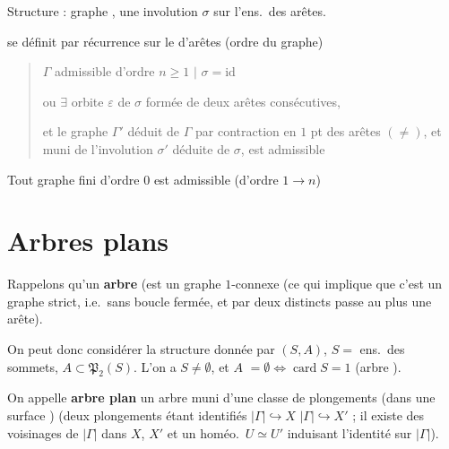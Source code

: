 \documentclass[11pt,a4paper]{article}
\begin{document}
Structure : graphe , une involution $\sigma$ \ill{} sur
l'ens.\ des arêtes.

 se définit par récurrence sur le \ill{} \ill{} d'arêtes
(ordre du graphe)

\begin{quote}
$\Gamma$ admissible d'ordre $n \geq 1$ \quad $\big|$ \quad
$\sigma = \mathrm{id}$

\qquad ou $\exists$ orbite $\varepsilon$ de $\sigma$ formée de deux arêtes
consécutives,

\qquad et le graphe $\Gamma'$ déduit de $\Gamma$ par contraction en $1$ pt
\ill{}  \ill{} des arêtes $(\neq)$, et muni de l'involution
$\sigma'$ déduite de $\sigma$, est admissible
\end{quote}


Tout graphe fini d'ordre $0$ est admissible \quad (d'ordre $1 \to n$)

\section{Arbres plans}



Rappelons qu'un \textbf{arbre} (est un graphe  $1$-connexe (ce qui
implique que c'est un graphe strict, i.e.\ sans boucle fermée, et par deux
  distincts passe au plus une arête).


On peut donc considérer la structure donnée par $(S,A)$, $S = $ ens.\ des
sommets, $A \subset \mathfrak{P}_2(S)$. \struck{\ill{}} L'on a $S \neq \emptyset$,
et $A$ \struck{$\neq$} $= \emptyset \Longleftrightarrow \operatorname{card} S = 1$
(arbre ).

On appelle \textbf{arbre plan} un arbre muni d'une classe de plongements
\add{\ill{}} (dans une surface \ill{}) (deux plongements étant identifiés
$|\Gamma| \hookrightarrow X$  $|\Gamma| \hookrightarrow X'$ ; il existe
des voisinages  de $|\Gamma|$ dans $X$, $X'$ et un homéo.\
$U \simeq U'$ induisant l'identité sur $|\Gamma|$).
\end{document}
